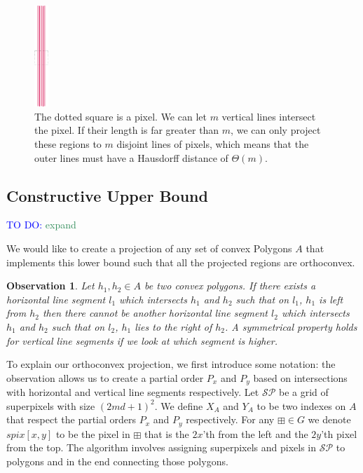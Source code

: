 \documentclass{paper}
\newtheorem{observation}{Observation}
\newcommand{\mremark}[3]{\textcolor{blue}{\textsc{#1 #2:}} \textcolor{SeaGreen}{\textsf{#3}}}
\newcommand{\todo}[2][DO]{\mremark{TO}{#1}{#2}}
\newcommand{\spg}{\mathcal{S\!P}}
\newcommand{\spix}{\boxplus}
\begin{document}
{\begin{figure}[H]
\centering
\includegraphics[width=20px]{Figures/linesexample.png}
\caption{The dotted square is a pixel. We can let $m$ vertical lines intersect the pixel. If their length is far greater than $m$, we can only project these regions to $m$ disjoint lines of pixels, which means that the outer lines must have a Hausdorff distance of $\Theta(m)$.}
\label{fig:linesexample}
\end{figure}



\subsection{Constructive Upper Bound}
\label{sub:convex_upper}

\todo{expand}

We would like to create a projection of any set of convex Polygons $A$ that implements this lower bound such that all the projected regions are orthoconvex.



\begin{observation}
Let $h_1,h_2 \in A$ be two convex polygons. If there exists a horizontal line segment $l_1$ which intersects $h_1$ and $h_2$ such that on $l_1$, $h_1$ is left from $h_2$ then there cannot be another horizontal line segment $l_2$ which intersects $h_1$ and $h_2$ such that on $l_2$, $h_1$ lies to the right of $h_2$. A symmetrical property holds for vertical line segments if we look at which segment is higher.
\end{observation}

To explain our orthoconvex projection, we first introduce some notation: the observation allows us to create a partial order $P_x$ and $P_y$ based on intersections with horizontal and vertical line segments respectively. Let $\spg$ be a grid of superpixels with size $(2md+1)^2$. We define $X_A$ and $Y_A$ to be two indexes on $A$ that respect the partial orders $P_x$ and $P_y$ respectively. For any $\spix \in G$ we denote $spix[x,y]$ to be the pixel in $\spix$ that is the $2x$'th from the left and the $2y$'th pixel from the top. The algorithm involves assigning superpixels and pixels in $\spg$ to polygons and in the end connecting those polygons.

}
\end{document}
